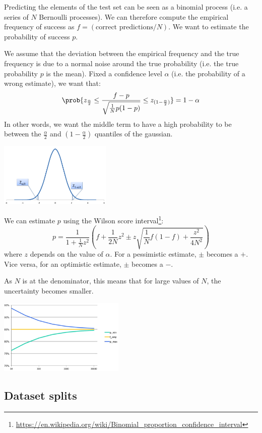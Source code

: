 Predicting the elements of the test set can be seen as a binomial process (i.e. a series of $N$ Bernoulli processes).
We can therefore compute the empirical frequency of success as $f = (\text{correct predictions}/N)$.
We want to estimate the probability of success $p$.

We assume that the deviation between the empirical frequency and the true frequency is due to a 
normal noise around the true probability (i.e. the true probability $p$ is the mean).
Fixed a confidence level $\alpha$ (i.e. the probability of a wrong estimate),
we want that:
\[ \prob{ z_{\frac{\alpha}{2}} \leq \frac{f-p}{\sqrt{\frac{1}{N}p(1-p)}} \leq z_{(1-\frac{\alpha}{2})} } = 1 - \alpha \]
In other words, we want the middle term to have a high probability to 
be between the $\frac{\alpha}{2}$ and $(1-\frac{\alpha}{2})$ quantiles of the gaussian.
\begin{center}
    \includegraphics[width=0.4\textwidth]{img/normal_quantile_test_error.png}
\end{center}

We can estimate $p$ using the Wilson score interval\footnote{\url{https://en.wikipedia.org/wiki/Binomial_proportion_confidence_interval}}:
\[ p = \frac{1}{1+\frac{1}{N}z^2} \left( f + \frac{1}{2N}z^2 \pm z\sqrt{\frac{1}{N}f(1-f) + \frac{z^2}{4N^2}} \right) \]
where $z$ depends on the value of $\alpha$.
For a pessimistic estimate, $\pm$ becomes a $+$. Vice versa, for an optimistic estimate, $\pm$ becomes a $-$.

As $N$ is at the denominator, this means that for large values of $N$, the uncertainty becomes smaller.
\begin{center}
    \includegraphics[width=0.45\textwidth]{img/confidence_interval.png}
\end{center}

\subsection{Dataset splits}

